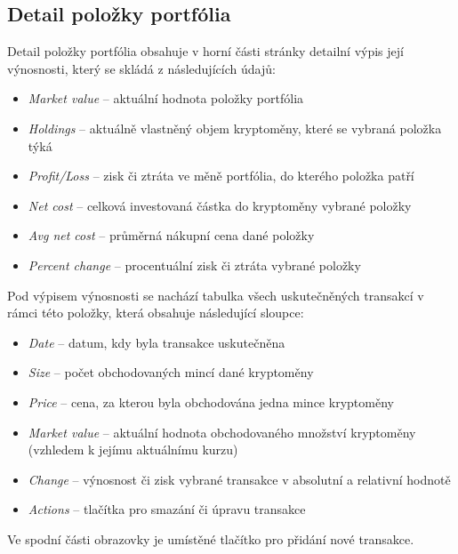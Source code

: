\documentclass[12pt, a4paper]{article}
\begin{document}
    \subsection{Detail položky portfólia}
    Detail položky portfólia obsahuje v horní části stránky detailní výpis její výnosnosti, který se skládá z následujících údajů:
    \begin{itemize}
        \item \textit{Market value} -- aktuální hodnota položky portfólia
        \item \textit{Holdings} -- aktuálně vlastněný objem kryptoměny, které se vybraná položka týká
        \item \textit{Profit/Loss} -- zisk či ztráta ve měně portfólia, do kterého položka patří
        \item \textit{Net cost} -- celková investovaná částka do kryptoměny vybrané položky
        \item \textit{Avg net cost} -- průměrná nákupní cena dané položky
        \item \textit{Percent change} -- procentuální zisk či ztráta vybrané položky
    \end{itemize}
    
    Pod výpisem výnosnosti se nachází tabulka všech uskutečněných transakcí v rámci této položky, která obsahuje následující sloupce:
    \begin{itemize}
        \item \textit{Date} -- datum, kdy byla transakce uskutečněna
        \item \textit{Size} -- počet obchodovaných mincí dané kryptoměny
        \item \textit{Price} -- cena, za kterou byla obchodována jedna mince kryptoměny
        \item \textit{Market value} -- aktuální hodnota obchodovaného množství kryptoměny (vzhledem k jejímu aktuálnímu kurzu)
        \item \textit{Change} -- výnosnost či zisk vybrané transakce v absolutní a relativní hodnotě
        \item \textit{Actions} -- tlačítka pro smazání či úpravu transakce
    \end{itemize}
    
    Ve spodní části obrazovky je umístěné tlačítko pro přidání nové transakce.
\end{document}
